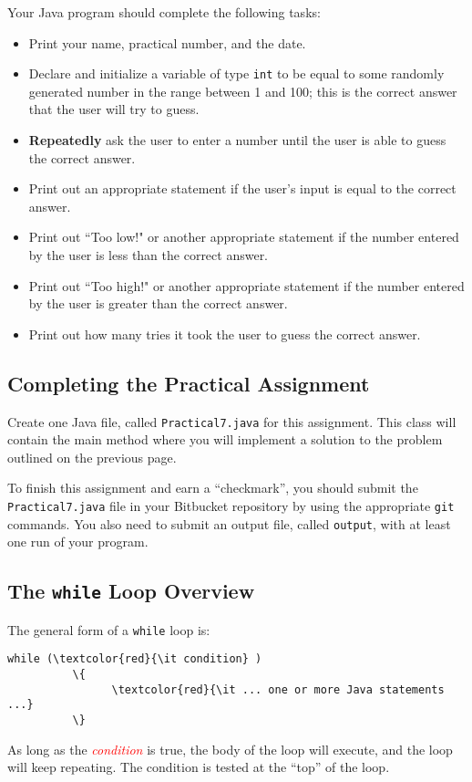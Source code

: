 Your Java program should complete the following tasks:
\begin{itemize}
\item Print your name, practical number, and the date.
\item 
Declare and initialize a variable of type {\tt int} to be equal to some
randomly generated number in the range between 1 and 100; this is the correct answer that the user will try to guess.
\item
\textbf{Repeatedly} ask the user to enter a number until the user is able to guess the correct answer.
\item
Print out an appropriate statement if the user's input is equal to the correct answer.
\item 
Print out ``Too low!" or another appropriate statement if the number entered by the user is less than the correct answer.
\item
Print out ``Too high!" or another appropriate statement if the number entered by the user is greater than the correct answer.
\item Print out how many tries it took the user to guess the correct answer.
\end{itemize}

\vspace*{-.1in}
\subsection*{Completing the Practical Assignment}
\vspace*{-.1in}
Create one Java file, called {\tt Practical7.java} for this assignment.
This class will contain the main method where you will implement a
solution to the problem outlined on the previous page.

\noindent To finish this assignment and earn a ``checkmark'', you should submit the
{\tt Practical7.java} file in your Bitbucket repository by using
the appropriate {\tt git} commands. You also need to submit an output file,
called {\tt output}, with at least one run of your program.

\vspace{-0.1in}
\subsection*{The {\tt while} Loop Overview}
\vspace*{-.05in}
The general form of a {\tt while} loop is:
\begin{Verbatim}[commandchars=\\\{\}]
          while (\textcolor{red}{\it condition} )
          \{
                \textcolor{red}{\it ... one or more Java statements ...}
          \}
\end{Verbatim}
\vspace{-0.15in}
As long as the \textcolor{red}{\it condition} is true, the body of the loop
will execute, and the loop will
keep repeating. The condition is tested at the ``top'' of the loop.

